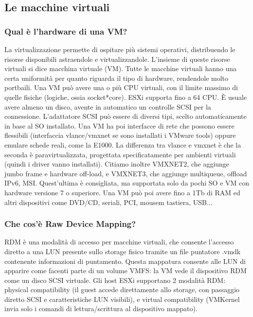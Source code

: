 \documentclass[11pt]{article}
\begin{document}
\subsection{Le macchine virtuali}
\subsubsection{Qual è l'hardware di una VM?}
La virtualizzazione permette di ospitare più sistemi operativi, distribuendo le risorse disponibili astraendole e virtualizzandole. L'insieme di queste risorse virtuali si dice macchina virtuale (VM). Tutte le macchine virtuali hanno una certa uniformità per quanto riguarda il tipo di hardware, rendendole molto portbaili. Una VM può avere una o più CPU virtuali, con il limite massimo di quelle fisiche (logiche, ossia socket*core). ESXi supporta fino a 64 CPU. È usuale avere almeno un disco, avente in automatico un controlle SCSI per la connessione. L'adattatore SCSI può essere di diversi tipi, scelto automaticamente in base al SO installato. Una VM ha poi interfacce di rete che possono essere flessibili (interfaccia vlance/vmxnet se sono installati i VMware tools) oppure emulare schede reali, come la E1000. La differenza tra vlance e vmxnet è che la seconda è paravirtualizzata, progettata specificatamente per ambienti virtuali (quindi i driver vanno installati). Citiamo inoltre VMXNET2, che aggiunge jumbo frame e hardware off-load, e VMXNET3, che aggiunge multiqueue, offload IPv6, MSI. Quest'ultima è consigliata, ma supportata solo da pochi SO e VM con hardware versione 7 o superiore. Una VM può poi avere fino a 1Tb di RAM ed altri dispositivi come DVD/CD, seriali, PCI, mousem tastiera, USB... 

\subsubsection{Che cos'è Raw Device Mapping?}
RDM è una modalità di accesso per macchine virtuali, che consente l'accesso diretto a una LUN presente sullo storage fisico tramite un file puntatore .vmdk contenente informazioni di puntamento. Questa mappatura consente alle LUN di apparire come facenti parte di un volume VMFS: la VM vede il dispositivo RDM come un disco SCSI virtuale. Gli host ESXi supportano 2 modalità RDM: physical compatibility (il guest accede direttamente allo storage, con passaggio diretto SCSI e caratteristiche LUN visibili), e virtual compatibility (VMKernel invia solo i comandi di lettura/scrittura al dispositivo mappato). 
\end{document}
